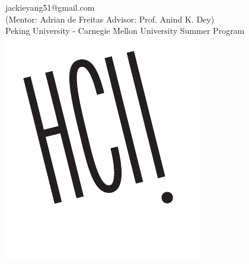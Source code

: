 \documentclass[a0paper,portrait]{baposter}
\begin{document}
\begin{poster}
{  jackieyang51@gmail.com\\
  (Mentor: Adrian de Freitas  Advisor: Prof. Anind K. Dey)\\
  Peking University - Carnegie Mellon University  Summer Program
}
{
  \includegraphics[height=0.75\headerheight]{HCII_white}
}



\end{poster}
\end{document}
